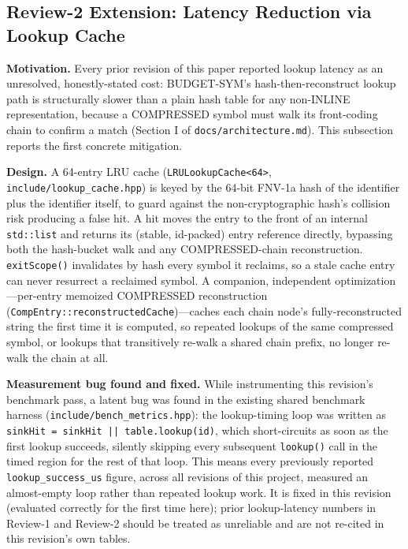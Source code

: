 \documentclass[conference]{IEEEtran}
\begin{document}
\subsection{Review-2 Extension: Latency Reduction via Lookup Cache}
\textbf{Motivation.} Every prior revision of this paper reported lookup
latency as an unresolved, honestly-stated cost: BUDGET-SYM's
hash-then-reconstruct lookup path is structurally slower than a plain hash
table for any non-INLINE representation, because a COMPRESSED symbol must
walk its front-coding chain to confirm a match (Section I of
\texttt{docs/architecture.md}). This subsection reports the first concrete
mitigation.

\textbf{Design.} A 64-entry LRU cache (\texttt{LRULookupCache<64>},
\texttt{include/lookup\_cache.hpp}) is keyed by the 64-bit FNV-1a hash of the
identifier plus the identifier itself, to guard against the non-cryptographic
hash's collision risk producing a false hit. A hit moves the entry to the
front of an internal \texttt{std::list} and returns its (stable, id-packed)
entry reference directly, bypassing both the hash-bucket walk and any
COMPRESSED-chain reconstruction. \texttt{exitScope()} invalidates by hash
every symbol it reclaims, so a stale cache entry can never resurrect a
reclaimed symbol. A companion, independent optimization---per-entry memoized
COMPRESSED reconstruction (\texttt{CompEntry::reconstructedCache})---caches
each chain node's fully-reconstructed string the first time it is computed,
so repeated lookups of the same compressed symbol, or lookups that
transitively re-walk a shared chain prefix, no longer re-walk the chain at
all.

\textbf{Measurement bug found and fixed.} While instrumenting this
revision's benchmark pass, a latent bug was found in the existing shared
benchmark harness (\texttt{include/bench\_metrics.hpp}): the lookup-timing
loop was written as \texttt{sinkHit = sinkHit || table.lookup(id)}, which
short-circuits as soon as the first lookup succeeds, silently skipping every
subsequent \texttt{lookup()} call in the timed region for the rest of that
loop. This means every previously reported \texttt{lookup\_success\_us}
figure, across all revisions of this project, measured an almost-empty loop
rather than repeated lookup work. It is fixed in this revision (evaluated
correctly for the first time here); prior lookup-latency numbers in Review-1
and Review-2 should be treated as unreliable and are not re-cited in this
revision's own tables.
\end{document}
